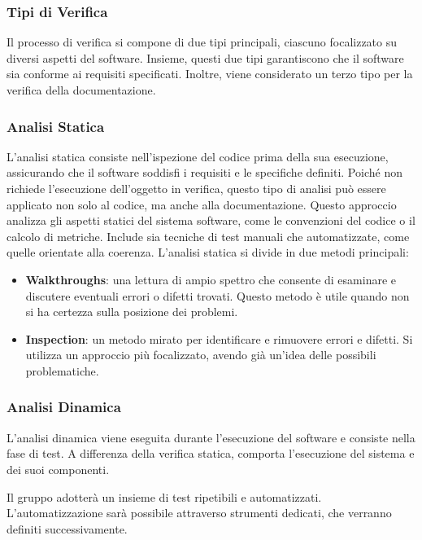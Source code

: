 \subsubsection{Tipi di Verifica}
Il processo di verifica si compone di due tipi principali, ciascuno focalizzato su diversi aspetti del software. 
Insieme, questi due tipi garantiscono che il software sia conforme ai requisiti specificati. 
Inoltre, viene considerato un terzo tipo per la verifica della documentazione.

\subsubsection*{Analisi Statica}
L’analisi statica consiste nell’ispezione del codice prima della sua esecuzione, assicurando che il software soddisfi 
i requisiti e le specifiche definiti. Poiché non richiede l’esecuzione dell’oggetto in verifica, questo tipo di analisi 
può essere applicato non solo al codice, ma anche alla documentazione.
Questo approccio analizza gli aspetti statici del sistema software, come le convenzioni del codice o il calcolo di metriche. 
Include sia tecniche di test manuali che automatizzate, come quelle orientate alla coerenza.  
L’analisi statica si divide in due metodi principali:
\begin{itemize}
    \item \textbf{Walkthroughs}: una lettura di ampio spettro che consente di esaminare e discutere 
    eventuali errori o difetti trovati. Questo metodo è utile quando non si ha certezza sulla posizione dei problemi.
    \item \textbf{Inspection}: un metodo mirato per identificare e rimuovere errori e difetti. 
    Si utilizza un approccio più focalizzato, avendo già un'idea delle possibili problematiche.
\end{itemize}

\subsubsection*{Analisi Dinamica}
L’analisi dinamica viene eseguita durante l’esecuzione del software e consiste nella fase di test. A differenza della verifica statica, comporta l’esecuzione del sistema e dei suoi componenti.  

Il gruppo adotterà un insieme di test ripetibili e automatizzati. L’automatizzazione sarà possibile attraverso strumenti dedicati, che verranno definiti successivamente.

